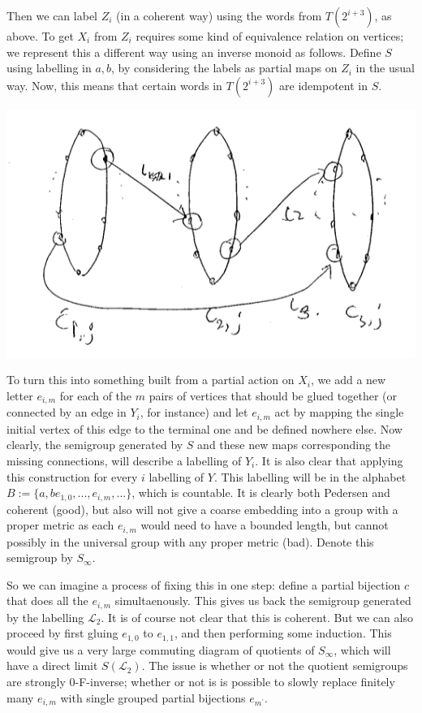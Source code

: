 \documentclass[11pt,a4paper]{amsart}
\theoremstyle{plain}
\theoremstyle{definition}%
\theoremstyle{remark}%
\begin{document}
Then we can label $Z_{i}$ (in a coherent way) using the words from $T(2^{i+3})$, as above. To get $X_{i}$ from $Z_{i}$ requires some kind of equivalence relation on vertices; we represent this a different way using an inverse monoid as follows. Define $S$ using labelling in $a,b$, by considering the labels as partial maps on $Z_{i}$ in the usual way. Now, this means that certain words in $T(2^{i+3})$ are idempotent in $S$.

\begin{center}
\includegraphics[scale=0.6]{invsemigraph.png}
\end{center}

To turn this into something built from a partial action on $X_{i}$, we add a new letter $e_{i,m}$ for each of the $m$ pairs of vertices that should be glued together (or connected by an edge in $Y_{i}$, for instance) and let $e_{i,m}$ act by mapping the single initial vertex of this edge to the terminal one and be defined nowhere else. Now clearly, the semigroup generated by $S$ and these new maps corresponding the missing connections, will describe a labelling of $Y_{i}$. It is also clear that applying this construction for every $i$ labelling of $Y$. This labelling will be in the alphabet $B:=\lbrace a,b e_{1,0},...,e_{i,m},... \rbrace$, which is countable. It is clearly both Pedersen and coherent (good), but also will not give a coarse embedding into a group with a proper metric as each $e_{i,m}$ would need to have a bounded length, but cannot possibly in the universal group with any proper metric (bad). Denote this semigroup by $S_{\infty}$.

So we can imagine a process of fixing this in one step: define a partial bijection $c$ that does all the $e_{i,m}$ simultaenously. This gives us back the semigroup generated by the labelling $\mathcal{L}_{2}$. It is of course not clear that this is coherent. But we can also proceed by first gluing $e_{1,0}$ to $e_{1,1}$, and then performing some induction. This would give us a very large commuting diagram of quotients of $S_{\infty}$, which will have a direct limit $S(\mathcal{L}_{2})$. The issue is whether or not the quotient semigroups are strongly 0-F-inverse; whether or not is is possible to slowly replace finitely many $e_{i,m}$ with single grouped partial bijections $e_{m^{'}}$.
\end{document}
